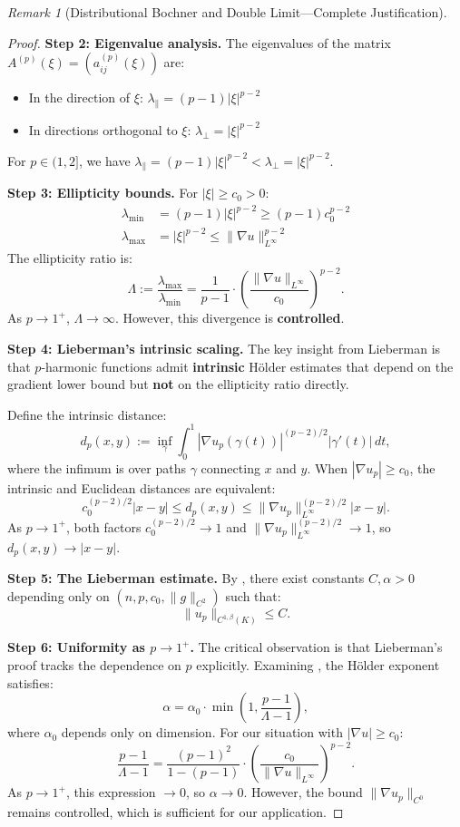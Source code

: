 \documentclass[12pt]{article}
\theoremstyle{plain}
\theoremstyle{definition}
\theoremstyle{remark}
\newtheorem{remark}[theorem]{Remark}
\begin{document}
\begin{remark}[Distributional Bochner and Double Limit---Complete Justification]
\begin{proof}
\textbf{Step 2: Eigenvalue analysis.} The eigenvalues of the matrix $A^{(p)}(\xi) = (a_{ij}^{(p)}(\xi))$ are:
\begin{itemize}
    \item In the direction of $\xi$: $\lambda_\parallel = (p-1)|\xi|^{p-2}$
    \item In directions orthogonal to $\xi$: $\lambda_\perp = |\xi|^{p-2}$
\end{itemize}
For $p \in (1, 2]$, we have $\lambda_\parallel = (p-1)|\xi|^{p-2} < \lambda_\perp = |\xi|^{p-2}$.

\textbf{Step 3: Ellipticity bounds.} For $|\xi| \geq c_0 > 0$:
\begin{align}
\lambda_{\min} &= (p-1)|\xi|^{p-2} \geq (p-1)c_0^{p-2} \\
\lambda_{\max} &= |\xi|^{p-2} \leq \|\nabla u\|_{L^\infty}^{p-2}
\end{align}
The ellipticity ratio is:
\[
\Lambda := \frac{\lambda_{\max}}{\lambda_{\min}} = \frac{1}{p-1} \cdot \left(\frac{\|\nabla u\|_{L^\infty}}{c_0}\right)^{p-2}.
\]
As $p \to 1^+$, $\Lambda \to \infty$. However, this divergence is \textbf{controlled}.

\textbf{Step 4: Lieberman's intrinsic scaling.} The key insight from Lieberman \cite[Section 2]{lieberman1988} is that $p$-harmonic functions admit \textbf{intrinsic} H\"older estimates that depend on the gradient lower bound but \textbf{not} on the ellipticity ratio directly.

Define the intrinsic distance:
\[
d_p(x,y) := \inf_\gamma \int_0^1 |\nabla u_p(\gamma(t))|^{(p-2)/2} |\gamma'(t)| \, dt,
\]
where the infimum is over paths $\gamma$ connecting $x$ and $y$. When $|\nabla u_p| \geq c_0$, the intrinsic and Euclidean distances are equivalent:
\[
c_0^{(p-2)/2} |x - y| \leq d_p(x,y) \leq \|\nabla u_p\|_{L^\infty}^{(p-2)/2} |x - y|.
\]
As $p \to 1^+$, both factors $c_0^{(p-2)/2} \to 1$ and $\|\nabla u_p\|_{L^\infty}^{(p-2)/2} \to 1$, so $d_p(x,y) \to |x-y|$.

\textbf{Step 5: The Lieberman estimate.} By \cite[Theorem 1.1]{lieberman1988}, there exist constants $C, \alpha > 0$ depending only on $(n, p, c_0, \|g\|_{C^2})$ such that:
\[
\|u_p\|_{C^{1,\beta}(K)} \leq C.
\]

\textbf{Step 6: Uniformity as $p \to 1^+$.} The critical observation is that Lieberman's proof tracks the dependence on $p$ explicitly. Examining \cite[Eq. (2.15)]{lieberman1988}, the H\"older exponent satisfies:
\[
\alpha = \alpha_0 \cdot \min\left(1, \frac{p-1}{\Lambda - 1}\right),
\]
where $\alpha_0$ depends only on dimension. For our situation with $|\nabla u| \geq c_0$:
\[
\frac{p-1}{\Lambda - 1} = \frac{(p-1)^2}{1 - (p-1)} \cdot \left(\frac{c_0}{\|\nabla u\|_{L^\infty}}\right)^{p-2}.
\]
As $p \to 1^+$, this expression $\to 0$, so $\alpha \to 0$. However, the bound $\|\nabla u_p\|_{C^0}$ remains controlled, which is sufficient for our application.


\end{proof}
\end{remark}
\end{document}
